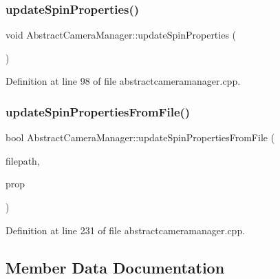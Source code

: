 \mbox{\label{class_abstract_camera_manager_a26eac9ad8b2d2fe00bd557453c90d012}} 
\subsubsection{\texorpdfstring{updateSpinProperties()}{updateSpinProperties()}\hspace{0.1cm}{\footnotesize\ttfamily [2/2]}}
{\footnotesize\ttfamily void Abstract\+Camera\+Manager\+::update\+Spin\+Properties (\begin{DoxyParamCaption}{ }\end{DoxyParamCaption})}



Definition at line 98 of file abstractcameramanager.\+cpp.

\mbox{\label{class_abstract_camera_manager_a33b5b6ea968d18e5931ecbd38596fac8}} 
\subsubsection{\texorpdfstring{updateSpinPropertiesFromFile()}{updateSpinPropertiesFromFile()}}
{\footnotesize\ttfamily bool Abstract\+Camera\+Manager\+::update\+Spin\+Properties\+From\+File (\begin{DoxyParamCaption}\item[{Q\+String \&}]{filepath,  }\item[{std\+::vector$<$ \mbox{\hyperlink{class_camera_manager_spin_1_1_spin_camera_property}{Spin\+Camera\+Property}} $>$ \&}]{prop }\end{DoxyParamCaption})}



Definition at line 231 of file abstractcameramanager.\+cpp.



\subsection{Member Data Documentation}
\mbox{\label{class_abstract_camera_manager_a6487a5d1471603bd4c9cd18ff953813d}} 
